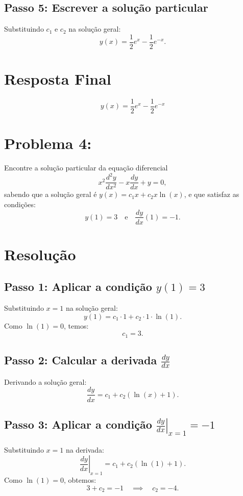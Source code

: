 \documentclass[12pt,a4paper]{article}
\begin{document}
\subsection*{Passo 5: Escrever a solução particular}
Substituindo \(c_1\) e \(c_2\) na solução geral:
\[
y(x) = \frac{1}{2}e^{x} - \frac{1}{2}e^{-x}.
\]

\section*{Resposta Final}
\[
\boxed{y(x) = \frac{1}{2}e^{x} - \frac{1}{2}e^{-x}}
\]




\section*{Problema 4: }
Encontre a solução particular da equação diferencial
\[
x^2 \frac{d^2 y}{dx^2} - x \frac{dy}{dx} + y = 0,
\]
sabendo que a solução geral é \( y(x) = c_1 x + c_2 x \ln(x) \), e que satisfaz as condições:
\[
y(1) = 3 \quad \text{e} \quad \frac{dy}{dx} (1)= -1.
\]

\section*{Resolução}

\subsection*{Passo 1: Aplicar a condição \( y(1) = 3 \)}
Substituindo \( x = 1 \) na solução geral:
\[
y(1) = c_1 \cdot 1 + c_2 \cdot 1 \cdot \ln(1).
\]
Como \( \ln(1) = 0 \), temos:
\[
c_1 = 3.
\]

\subsection*{Passo 2: Calcular a derivada \( \frac{dy}{dx} \)}
Derivando a solução geral:
\[
\frac{dy}{dx} = c_1 + c_2 \left( \ln(x) + 1 \right).
\]

\subsection*{Passo 3: Aplicar a condição \( \left.\frac{dy}{dx}\right|_{x=1} = -1 \)}
Substituindo \( x = 1 \) na derivada:
\[
\left.\frac{dy}{dx}\right|_{x=1} = c_1 + c_2 \left( \ln(1) + 1 \right).
\]
Como \( \ln(1) = 0 \), obtemos:
\[
3 + c_2 = -1 \quad \implies \quad c_2 = -4.
\]
\end{document}
